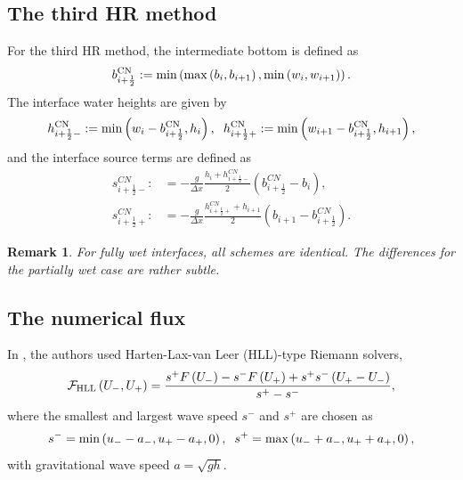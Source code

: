 \documentclass[11pt,a4paper,center,notitlepage]{article}
\numberwithin{equation}{section}
\newtheorem{remark}{Remark}
\begin{document}
\subsection{The third HR method}
For the third HR method, the intermediate bottom is defined as
\begin{align}
\label{3.16}
b_{i + \frac{1}{2}}^{\rm CN}: = \min \left( {\max \left( {{b_i},{b_{i + 1}}} \right),\min \left( {{w_i},{w_{i + 1}}} \right)} \right). 
\end{align}
The interface water heights are given by
\begin{align}
\label{3.17}
h_{i + \frac{1}{2} - }^{\rm CN}: = \min \left( {{w_i} - b_{i + \frac{1}{2}}^{\rm CN},{h_i}} \right), \hspace{2mm} h_{i + \frac{1}{2} + }^{\rm CN}: = \min \left( {{w_{i + 1}} - b_{i + \frac{1}{2}}^{\rm CN},{h_{i + 1}}} \right),
\end{align}
and the interface source terms are defined as 
\begin{align}
s_{i + \frac{1}{2} - }^{CN}: &=  - \frac{g}{{\Delta x}}\frac{{{h_i} + h_{i + \frac{1}{2} - }^{CN}}}{2}\left( {b_{i + \frac{1}{2}}^{CN} - {b_i}} \right),\\
s_{i + \frac{1}{2} + }^{CN}: &=  - \frac{g}{{\Delta x}}\frac{{h_{i + \frac{1}{2} + }^{CN} + {h_{i + 1}}}}{2}\left( {{b_{i + 1}} - b_{i + \frac{1}{2}}^{CN}} \right).
\end{align}

\begin{remark}
For fully wet interfaces, all schemes are identical. The differences for the partially wet case are rather subtle.
\end{remark}

\subsection{The numerical flux}
In \cite[p. 763]{Chen2017}, the authors used Harten-Lax-van Leer (HLL)-type Riemann solvers,
\begin{align}
\label{3.20}
{\mathcal{F}_{\rm HLL}}\left( {{U_ - },{U_ + }} \right) = \frac{{{s^ + }F\left( {{U_ - }} \right) - {s^ - }F\left( {{U_ + }} \right) + {s^ + }{s^ - }\left( {{U_ + } - {U_ - }} \right)}}{{{s^ + } - {s^ - }}},
\end{align}
where the smallest and largest wave speed $s^-$ and $s^+$ are chosen as
\begin{align}
\label{3.21}
{s^ - } = \min \left( {{u_ - } - {a_ - },{u_ + } - {a_ + },0} \right), \hspace{2mm} {s^ + } = \max \left( {{u_ - } + {a_ - },{u_ + } + {a_ + },0} \right),
\end{align}
with gravitational wave speed $a = \sqrt {gh}$.
\end{document}
